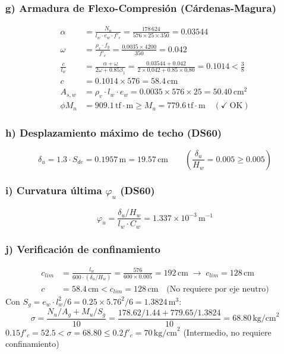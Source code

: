 \subsubsection*{g) Armadura de Flexo-Compresión (Cárdenas-Magura)}
\begin{align*}
\alpha &= \frac{N_u}{l_w\cdot e_w\cdot f'_c}
        = \frac{178\,624}{576\times25\times350}=0.03544\\
\omega &= \frac{\rho_v\cdot f_y}{f'_c}
        = \frac{0.0035\times4200}{350}=0.042\\
\frac{c}{l_w} &= \frac{\alpha+\omega}{2\omega+0.85\beta_1}
               = \frac{0.03544+0.042}{2\times0.042+0.85\times0.80}
               = 0.1014 < \tfrac{3}{8}\\
c       &= 0.1014\times576=58.4\,\text{cm}\\
A_{s,w} &= \rho_v\cdot l_w\cdot e_w=0.0035\times576\times25=50.40\,\text{cm}^2\\
\phi M_n &= 909.1\,\text{tf}\cdot\text{m}
           \geq M_u=779.6\,\text{tf}\cdot\text{m} \quad(\checkmark~\text{OK})
\end{align*}

\subsubsection*{h) Desplazamiento máximo de techo (DS60)}
\begin{equation*}
\delta_u = 1.3\cdot S_{de} = 0.1957\,\text{m}=19.57\,\text{cm}
\qquad \left(\frac{\delta_u}{H_w}=0.005\geq0.005\right)
\end{equation*}

\subsubsection*{i) Curvatura última $\varphi_u$ (DS60)}
\begin{equation*}
\varphi_u = \frac{\delta_u/H_w}{l_w\cdot C_w}=1.337\times10^{-3}\,\text{m}^{-1}
\end{equation*}

\subsubsection*{j) Verificación de confinamiento}
\begin{align*}
c_{lim} &= \frac{l_w}{600\cdot(\delta_u/H_w)}
         = \frac{576}{600\times0.005}=192\,\text{cm}
         \;\rightarrow\; c_{lim}=128\,\text{cm}\\
c       &= 58.4\,\text{cm}<c_{lim}=128\,\text{cm}
         \quad\text{(No requiere por eje neutro)}
\end{align*}
Con $S_g = e_w\cdot l_w^2/6 = 0.25\times5.76^2/6 = 1.3824\,\text{m}^3$:
\begin{equation*}
\sigma = \frac{N_u/A_g + M_u/S_g}{10}
       = \frac{178.62/1.44 + 779.65/1.3824}{10}
       = 68.80\,\text{kg/cm}^2
\end{equation*}
$0.15f'_c=52.5 < \sigma=68.80 \leq 0.2f'_c=70\,\text{kg/cm}^2$
\quad(Intermedio, no requiere confinamiento)

